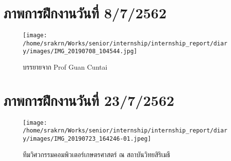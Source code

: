 \section*{ภาพการฝึกงานวันที่ 8/7/2562}
\begin{figure}[H]
    \centering
    \texttt{[image: /home/srakrn/Works/senior/internship/internship\_report/diary/images/IMG\_20190708\_104544.jpg]}
    \caption{บรรยายจาก Prof Guan Cuntai}
\end{figure}

\section*{ภาพการฝึกงานวันที่ 23/7/2562}
\begin{figure}[H]
    \centering
    \texttt{[image: /home/srakrn/Works/senior/internship/internship\_report/diary/images/IMG\_20190723\_164246-01.jpeg]}
    \caption{ทีมวิศวกรรมคอมพิวเตอร์เกษตรศาสตร์ ณ สถาบันวิทยสิริเมธี}
\end{figure}
